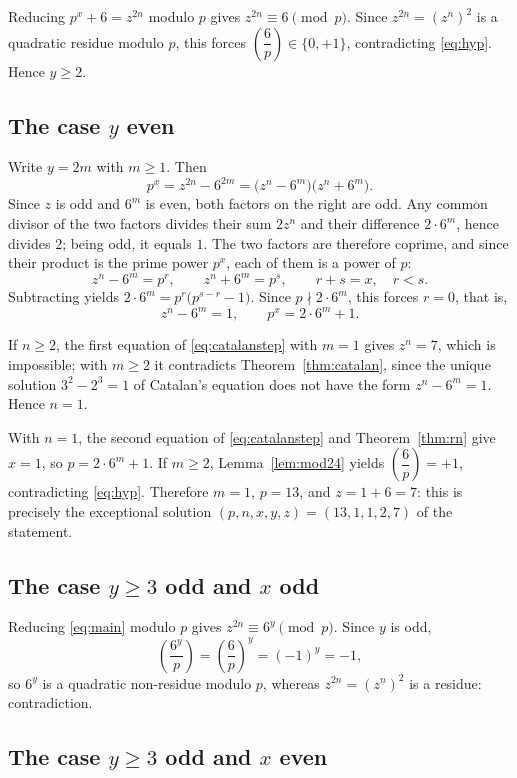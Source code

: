 \documentclass[preprint,12pt]{elsarticle}
\theoremstyle{definition}
\newcommand{\leg}[2]{\left(\dfrac{#1}{#2}\right)}
\begin{document}
Reducing $p^{x}+6=z^{2n}$ modulo $p$ gives $z^{2n}\equiv 6\pmod p$. Since
$z^{2n}=(z^{n})^{2}$ is a quadratic residue modulo $p$, this forces
$\leg{6}{p}\in\{0,+1\}$, contradicting \eqref{eq:hyp}. Hence $y\geq 2$.

\subsection{The case $y$ even}

Write $y=2m$ with $m\geq 1$. Then
\[
p^{x}=z^{2n}-6^{2m}=\bigl(z^{n}-6^{m}\bigr)\bigl(z^{n}+6^{m}\bigr).
\]
Since $z$ is odd and $6^{m}$ is even, both factors on the right are odd. Any
common divisor of the two factors divides their sum $2z^{n}$ and their
difference $2\cdot 6^{m}$, hence divides $2$; being odd, it equals $1$. The
two factors are therefore coprime, and since their product is the prime power
$p^{x}$, each of them is a power of $p$:
\[
z^{n}-6^{m}=p^{r},\qquad z^{n}+6^{m}=p^{s},\qquad r+s=x,\quad r<s.
\]
Subtracting yields $2\cdot 6^{m}=p^{r}\bigl(p^{s-r}-1\bigr)$. Since
$p\nmid 2\cdot 6^{m}$, this forces $r=0$, that is,
\begin{equation}\label{eq:catalanstep}
z^{n}-6^{m}=1,
\qquad
p^{x}=2\cdot 6^{m}+1.
\end{equation}

If $n\geq 2$, the first equation of \eqref{eq:catalanstep} with $m=1$ gives
$z^{n}=7$, which is impossible; with $m\geq 2$ it contradicts
Theorem~\ref{thm:catalan}, since the unique solution $3^{2}-2^{3}=1$ of
Catalan's equation does not have the form $z^{n}-6^{m}=1$. Hence $n=1$.

With $n=1$, the second equation of \eqref{eq:catalanstep} and
Theorem~\ref{thm:rn} give $x=1$, so $p=2\cdot 6^{m}+1$. If $m\geq 2$,
Lemma~\ref{lem:mod24} yields $\leg{6}{p}=+1$, contradicting \eqref{eq:hyp}.
Therefore $m=1$, $p=13$, and $z=1+6=7$: this is precisely the exceptional
solution $(p,n,x,y,z)=(13,1,1,2,7)$ of the statement.

\subsection{The case $y\geq 3$ odd and $x$ odd}

Reducing \eqref{eq:main} modulo $p$ gives $z^{2n}\equiv 6^{y}\pmod p$. Since
$y$ is odd,
\[
\leg{6^{y}}{p}=\leg{6}{p}^{y}=(-1)^{y}=-1,
\]
so $6^{y}$ is a quadratic non-residue modulo $p$, whereas $z^{2n}=(z^{n})^{2}$
is a residue: contradiction.

\subsection{The case $y\geq 3$ odd and $x$ even}
\end{document}
